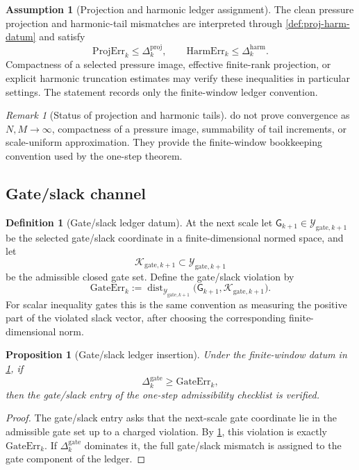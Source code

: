 \documentclass[11pt]{article}
\numberwithin{equation}{section}
\theoremstyle{plain}
\newtheorem{proposition}[theorem]{Proposition}
\theoremstyle{definition}
\newtheorem{definition}[theorem]{Definition}
\newtheorem{assumption}[theorem]{Assumption}
\theoremstyle{remark}
\newtheorem{remark}[theorem]{Remark}
\newcommand{\harm}{\mathrm{harm}}
\newcommand{\proj}{\mathrm{proj}}
\newcommand{\gate}{\mathrm{gate}}
\newcommand{\Dist}{\operatorname{dist}}
\begin{document}
\begin{assumption}[Projection and harmonic ledger assignment]\label{ass:proj-harm}
The clean pressure projection and harmonic-tail mismatches are interpreted
through \cref{def:proj-harm-datum} and satisfy
\[
  \mathrm{ProjErr}_k\le\Delta_k^{\proj},
  \qquad
  \mathrm{HarmErr}_k\le\Delta_k^{\harm}.
\]
Compactness of a selected pressure image, effective finite-rank projection, or
explicit harmonic truncation estimates may verify these inequalities in
particular settings.  The statement records only the finite-window ledger
convention.
\end{assumption}

\begin{remark}[Status of projection and harmonic tails]
 do not prove convergence
as \(N,M\to\infty\), compactness of a pressure image, summability of tail
increments, or scale-uniform approximation.  They provide the finite-window
bookkeeping convention used by the one-step theorem.
\end{remark}

\subsection{Gate/slack channel}

\begin{definition}[Gate/slack ledger datum]\label{def:gate-slack-datum}
At the next scale let \(\mathsf G_{k+1}\in\mathcal Y_{\gate,k+1}\) be the
selected gate/slack coordinate in a finite-dimensional normed space, and let
\[
  \mathcal K_{\gate,k+1}\subset\mathcal Y_{\gate,k+1}
\]
be the admissible closed gate set.  Define the gate/slack violation by
\[
  \mathrm{GateErr}_k
  :=
  \Dist_{\mathcal Y_{\gate,k+1}}
  \bigl(\mathsf G_{k+1},\mathcal K_{\gate,k+1}\bigr).
\]
For scalar inequality gates this is the same convention as measuring the
positive part of the violated slack vector, after choosing the corresponding
finite-dimensional norm.
\end{definition}

\begin{proposition}[Gate/slack ledger insertion]\label{prop:gate-slack-insertion}
Under the finite-window datum in \cref{def:gate-slack-datum}, if
\[
  \Delta_k^{\gate}\ge\mathrm{GateErr}_k,
\]
then the gate/slack entry of the one-step admissibility checklist is verified.
\end{proposition}

\begin{proof}
The gate/slack entry asks that the next-scale gate coordinate lie in the
admissible gate set up to a charged violation.  By
\cref{def:gate-slack-datum}, this violation is exactly
\(\mathrm{GateErr}_k\).  If \(\Delta_k^{\gate}\) dominates it, the full
gate/slack mismatch is assigned to the gate component of the ledger.
\end{proof}
\end{document}
